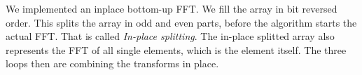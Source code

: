 We implemented an inplace bottom-up FFT. We fill the array in bit reversed order. This splits the array in odd and even parts, before the algorithm starts the actual FFT. That is called \textit{In-place splitting}. The in-place splitted array also represents the FFT of all single elements, which is the element itself. The three loops then are combining the transforms in place. 

